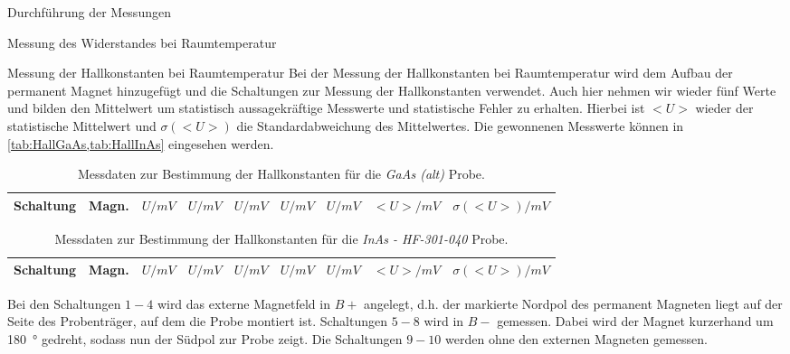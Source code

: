 \documentclass[pdftex, a4paper,11pt, twoside, ngerman]{report}
\begin{document}
\begin{chapter}{Durchführung der Messungen}
\begin{section}{Messung des Widerstandes bei Raumtemperatur}
      
    \end{section}
    
    
    
    \begin{section}{Messung der Hallkonstanten bei Raumtemperatur}
      \label{chp:MessungHallkonstanteRaumtemperatur}
      Bei der Messung der Hallkonstanten bei Raumtemperatur wird dem Aufbau der
      permanent Magnet hinzugefügt und die Schaltungen zur Messung der
      Hallkonstanten verwendet.
      Auch hier nehmen wir wieder fünf Werte und bilden den Mittelwert um
      statistisch aussagekräftige Messwerte und statistische Fehler zu erhalten.
      Hierbei ist $<U>$ wieder der statistische Mittelwert und $\sigma(<U>)$ die
      Standardabweichung des Mittelwertes.
      Die gewonnenen Messwerte können in
      \cref{tab:HallGaAs,tab:HallInAs} eingesehen werden.
      \begin{table}[htbp]
        \centering
        \footnotesize
        \begin{tabular}{ccccccccc}
          Schaltung & Magn. & $U / mV$ & $U / mV$  & $U / mV$  & $U / mV$  & $U / mV$
               & $<U> / mV$  & $\sigma(<U>) / mV$ \\ \hline \hline
          
        \end{tabular}
        \caption{Messdaten zur Bestimmung der Hallkonstanten für die
            \textit{GaAs (alt)} Probe.}
        \label{tab:HallGaAs}
      \end{table}
      \begin{table}[htbp]
        \centering
        \footnotesize
        \begin{tabular}{ccccccccc}
          Schaltung & Magn. & $U / mV$ & $U / mV$  & $U / mV$  & $U / mV$  & $U / mV$
               & $<U> / mV$  & $\sigma(<U>) / mV$ \\ \hline \hline
          
        \end{tabular}
        \caption{Messdaten zur Bestimmung der Hallkonstanten für die
            \textit{InAs - HF-301-040} Probe.}
        \label{tab:HallInAs}
      \end{table}
      
      Bei den Schaltungen $1-4$ wird das externe Magnetfeld in \textit{$B+$}
      angelegt, d.h. der markierte Nordpol des permanent Magneten liegt auf
      der Seite des Probenträger, auf dem die Probe montiert ist.
      Schaltungen $5-8$ wird in \textit{$B-$} gemessen. Dabei wird der Magnet
      kurzerhand um \SI{180}{\degree} gedreht, sodass nun der Südpol zur Probe
      zeigt.
      Die Schaltungen $9-10$ werden ohne den externen Magneten gemessen.
      

\end{section}
\end{chapter}
\end{document}
